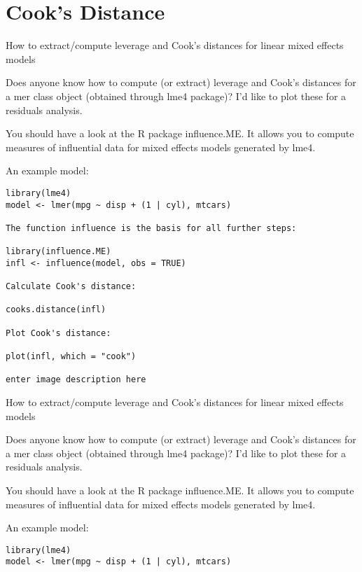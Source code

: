 \documentclass[12pt, a4paper]{article}
\begin{document}
\chapter{Cook's Distance}
How to extract/compute leverage and Cook's distances for linear mixed effects models

Does anyone know how to compute (or extract) leverage and Cook's distances for a mer class object (obtained through lme4 package)? I'd like to plot these for a residuals analysis.

You should have a look at the R package influence.ME. It allows you to compute measures of influential data for mixed effects models generated by lme4.

An example model:

\begin{verbatim}
library(lme4)
model <- lmer(mpg ~ disp + (1 | cyl), mtcars)

The function influence is the basis for all further steps:

library(influence.ME)
infl <- influence(model, obs = TRUE)

Calculate Cook's distance:

cooks.distance(infl)

Plot Cook's distance:

plot(infl, which = "cook")

enter image description here
\end{verbatim}


How to extract/compute leverage and Cook's distances for linear mixed effects models

Does anyone know how to compute (or extract) leverage and Cook's distances for a mer class object (obtained through lme4 package)? I'd like to plot these for a residuals analysis.

You should have a look at the R package influence.ME. It allows you to compute measures of influential data for mixed effects models generated by lme4.

An example model:

\begin{verbatim}
library(lme4)
model <- lmer(mpg ~ disp + (1 | cyl), mtcars)
\end{verbatim}
\end{document}
